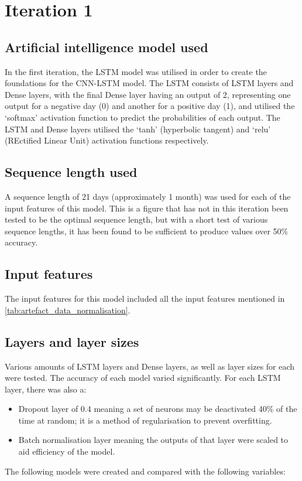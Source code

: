\section{Iteration 1}
\subsection{Artificial intelligence model used}\label{ssec:iteration1_ai_model}
In the first iteration, the LSTM model was utilised in order to create the foundations for the CNN-LSTM model. The LSTM
consists of LSTM layers and Dense layers, with the final Dense layer having an output of 2, representing one output for
a negative day (0) and another for a positive day (1), and utilised the `softmax' activation function to predict the
probabilities of each output. The LSTM and Dense layers utilised the `tanh' (hyperbolic tangent) and `relu'
(REctified Linear Unit) activation functions respectively.

\subsection{Sequence length used}
A sequence length of 21 days (approximately 1 month) was used for each of the input features of this model.
This is a figure that has not in this iteration been tested to be the optimal sequence length, but with a short
test of various sequence lengths, it has been found to be sufficient to produce values over 50\% accuracy.
\subsection{Input features}
The input features for this model included all the input features mentioned in \autoref{tab:artefact_data_normalisation}.

\subsection{Layers and layer sizes} \label{ssec:iteration1layers}
Various amounts of LSTM layers and Dense layers, as well as layer sizes for each were tested. The accuracy of each model varied
significantly. For each LSTM layer, there was also a:
\begin{itemize}
    \item Dropout layer of 0.4 meaning a set of neurons may be
    deactivated 40\% of the time at random; it is a method of regularisation to prevent overfitting.
    \item Batch normalisation layer meaning the outputs of that layer were scaled to aid efficiency of the model.
\end{itemize}
The following models were created and compared with the following variables:

